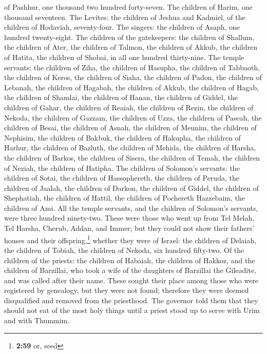 of Pashhur, one thousand two hundred forty-seven.  The
children of Harim, one thousand seventeen.  The Levites:
the children of Jeshua and Kadmiel, of the children of Hodaviah,
seventy-four.  The singers: the children of Asaph, one
hundred twenty-eight.  The children of the gatekeepers:
the children of Shallum, the children of Ater, the children of Talmon,
the children of Akkub, the children of Hatita, the children of Shobai,
in all one hundred thirty-nine.  The temple servants: the
children of Ziha, the children of Hasupha, the children of Tabbaoth,
 the children of Keros, the children of Siaha, the
children of Padon,  the children of Lebanah, the children
of Hagabah, the children of Akkub,  the children of
Hagab, the children of Shamlai, the children of Hanan, 
the children of Giddel, the children of Gahar, the children of Reaiah,
 the children of Rezin, the children of Nekoda, the
children of Gazzam,  the children of Uzza, the children
of Paseah, the children of Besai,  the children of Asnah,
the children of Meunim, the children of Nephisim,  the
children of Bakbuk, the children of Hakupha, the children of Harhur,
 the children of Bazluth, the children of Mehida, the
children of Harsha,  the children of Barkos, the children
of Sisera, the children of Temah,  the children of
Neziah, the children of Hatipha.  The children of
Solomon's servants: the children of Sotai, the children of Hassophereth,
the children of Peruda,  the children of Jaalah, the
children of Darkon, the children of Giddel,  the children
of Shephatiah, the children of Hattil, the children of Pochereth
Hazzebaim, the children of Ami.  All the temple servants,
and the children of Solomon's servants, were three hundred ninety-two.
 These were those who went up from Tel Melah, Tel Harsha,
Cherub, Addan, and Immer; but they could not show their fathers' houses
and their offspring,\footnote{\textbf{2:59} or, seed} whether they were
of Israel:  the children of Delaiah, the children of
Tobiah, the children of Nekoda, six hundred fifty-two. 
Of the children of the priests: the children of Habaiah, the children of
Hakkoz, and the children of Barzillai, who took a wife of the daughters
of Barzillai the Gileadite, and was called after their name.
 These sought their place among those who were registered
by genealogy, but they were not found; therefore they were deemed
disqualified and removed from the priesthood.  The
governor told them that they should not eat of the most holy things
until a priest stood up to serve with Urim and with Thummim.

